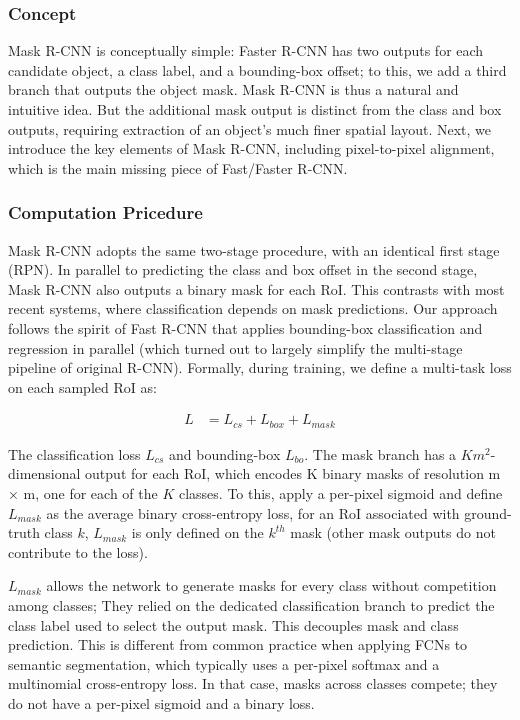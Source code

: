 \documentclass[a4paper, openany]{book}
\begin{document}
\subsubsection{Concept}
	\vspace{0.3cm}
Mask R-CNN is conceptually simple: Faster R-CNN has two outputs for each candidate object, a class label, and a bounding-box offset; to this, we add a third branch that outputs the object mask. Mask R-CNN is thus a natural and intuitive idea. But the additional mask output is distinct from the class and box outputs, requiring extraction of an object's much finer spatial layout. Next, we introduce the key elements of Mask R-CNN, including pixel-to-pixel alignment, which is the main missing piece of Fast/Faster R-CNN.
\newpage

\subsubsection{Computation Pricedure}
	\vspace{0.3cm}
	
Mask R-CNN adopts the same two-stage procedure, with an identical first stage (RPN). In parallel to predicting the class and box offset in the second stage, Mask R-CNN also outputs a binary mask for each RoI. This contrasts with most recent systems, where classification depends on mask predictions. Our approach follows the spirit of Fast R-CNN that applies bounding-box classification and regression in parallel (which turned out to largely simplify the multi-stage pipeline of original R-CNN). Formally, during training, we define a multi-task loss on each sampled RoI as:

\begin{eqnarray*}
L &= L_{cs} +L_{box}+L_{mask}
\end{eqnarray*}

The classification loss $L_{cs}$ and bounding-box $L_{bo}$. The mask branch has a $Km^2$-dimensional output for each RoI, which encodes K binary masks of resolution m × m, one for each of the $K$ classes. To this, apply a per-pixel sigmoid and define $L_{mask}$ as the average binary cross-entropy loss, for an RoI associated with ground-truth class $k$, $L_{mask}$ is only defined on the $k^{th}$ mask (other mask outputs do not contribute to the loss).

$L_{mask}$ allows the network to generate masks for every class without competition among classes; They relied on the dedicated classification branch to predict the class label used to select the output mask. This decouples mask and class prediction. This is different from common practice when applying FCNs to semantic segmentation, which typically uses a per-pixel softmax and a multinomial cross-entropy loss. In that case, masks across classes compete; they do not have a per-pixel sigmoid and a binary loss.
\end{document}
